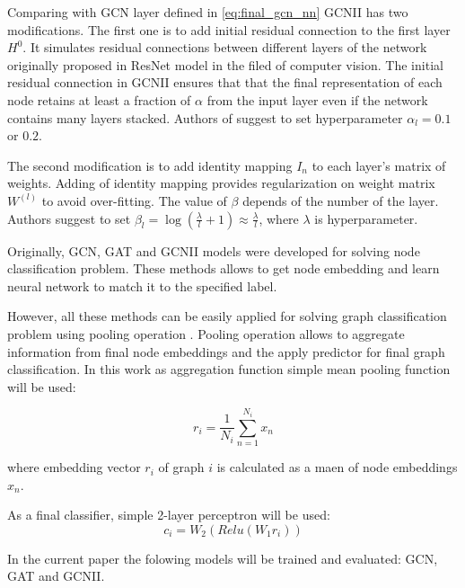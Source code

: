 Comparing with GCN layer defined in \ref{eq:final_gcn_nn} GCNII has two modifications.
The first one is to add initial residual connection to the first layer $H^0$. It simulates 
residual connections between different layers of the network originally proposed in 
ResNet model \cite{ResNet} in the filed of computer vision. 
The initial residual connection in GCNII ensures that that the final representation
of each node retains at least a fraction of $\alpha$ from the input layer even if the network contains
many layers stacked. Authors of \cite{GCNII} suggest to set hyperparameter $\alpha_l = 0.1$ or $0.2$.


The second modification is to add identity mapping $I_n$ to each layer's matrix of weights.
Adding of identity mapping provides regularization on weight matrix $W^{(l)}$ to avoid over-fitting.
The value of $\beta$ depends of the number of the layer. Authors suggest to set $\beta_l = \log(\frac{\lambda}{l}+1) \approx \frac{\lambda}{l}$,
where $\lambda$ is hyperparameter. 



Originally, GCN, GAT and GCNII models were developed for solving node classification problem.
These methods allows to get node embedding and learn neural network to match it to the specified label.

However, all these methods can be easily applied for solving graph classification problem using pooling operation \cite{distillGCN}.
Pooling operation allows to aggregate information from final node embeddings and the apply predictor for final graph classification.
In this work as aggregation function simple mean pooling function will be used:

\begin{equation}
    r_i = \frac{1}{N_i}\sum_{n=1}^{N_i}x_n
    \label{eq:mean_pool}
\end{equation}

where embedding vector $r_i$ of graph $i$ is calculated as a maen of node embeddings $x_n$.

As a final classifier, simple 2-layer perceptron will be used:
\begin{equation}
    c_i = W_2(Relu(W_1r_i))
    \label{eq:final_classifier}
\end{equation}


In the current paper the folowing models will be trained and evaluated: GCN\cite{GCN}, GAT\cite{GAT} and GCNII\cite{GCNII}.